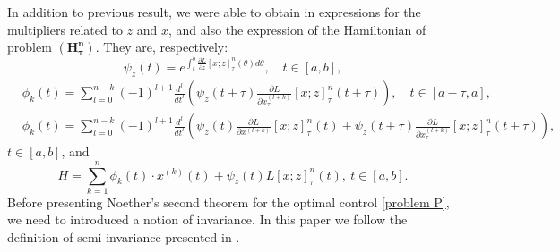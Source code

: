 \documentclass{my-aims}
\theoremstyle{definition}
\begin{document}
In addition to previous result, we were able to obtain in \cite{MyArt05} 
expressions for the multipliers related to $z$ and $x$, and also the 
expression of the Hamiltonian of problem $\mathbf{(H_\tau^n)}$. They are, 
respectively:
\begin{equation}
\label{psi_z}
\psi_z(t)=e^{\int_t^b\frac{\partial L}{\partial z}[x;z]^n_\tau(\theta)d\theta},
\quad t \in [a,b],
\end{equation}
\begin{equation}
\label{phi_k}
\begin{split}
&\phi_{k}(t)=\sum_{l=0}^{n-k}(-1)^{l+1}\frac{d^l}{dt^l}\left(\psi_{z}(t+\tau)
\frac{\partial L}{\partial x_\tau^{(l+k)}}[x;z]^n_\tau(t+\tau)\right), \quad t \in [a-\tau,a],\\
&\phi_{k}(t)=\sum_{l=0}^{n-k}(-1)^{l+1}\frac{d^l}{dt^l}\left(\psi_z(t)
\frac{\partial L}{\partial x^{(l+k)}}[x;z]^n_\tau(t)
+\psi_{z}(t+\tau)
\frac{\partial L}{\partial x_\tau^{(l+k)}}[x;z]^n_\tau(t+\tau)\right), 
\end{split}
\end{equation}
$t\in [a,b]$, and
\begin{equation}
\label{Hamilt H-O delay}
H=\sum_{k=1}^n\phi_k(t) \cdot x^{(k)}(t)
+\psi_z(t) L[x;z]^n_\tau(t), \ t\in [a,b].
\end{equation}
Before presenting Noether's second theorem for the optimal control \eqref{problem P}, 
we need to introduced a notion of invariance. In this paper we follow the definition 
of semi-invariance presented in \cite{Torres2003MR1980565}.
\end{document}
